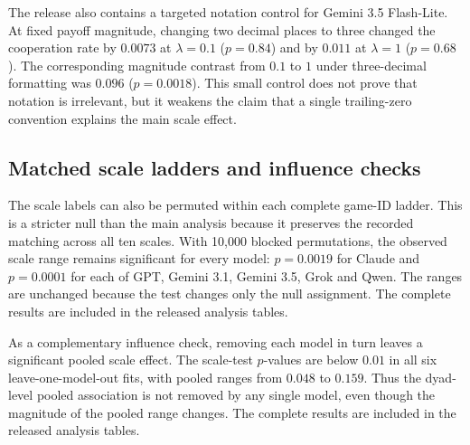 \documentclass[openacc]{rsproca_new}
\begin{document}
The release also contains a targeted notation control for Gemini 3.5 Flash-Lite.
At fixed payoff magnitude, changing two decimal places to three changed the
cooperation rate by $0.0073$ at $\lambda=0.1$ ($p=0.84$) and by $0.011$ at
$\lambda=1$ ($p=0.68$). The corresponding magnitude contrast from $0.1$ to $1$
under three-decimal formatting was $0.096$ ($p=0.0018$). This small control
does not prove that notation is irrelevant, but it weakens the claim that a
single trailing-zero convention explains the main scale effect.


\subsection{Matched scale ladders and influence checks}\label{appendix:robust_ladders}

The scale labels can also be permuted within each complete game-ID ladder. This
is a stricter null than the main analysis because it preserves the recorded
matching across all ten scales. With 10,000 blocked permutations, the observed
scale range remains significant for every model: $p=0.0019$ for Claude and
$p=0.0001$ for each of GPT, Gemini 3.1, Gemini 3.5, Grok and Qwen. The ranges
are unchanged because the test changes only the null assignment. The complete
results are included in the released analysis tables.

As a complementary influence check, removing each model in turn leaves a
significant pooled scale effect. The scale-test $p$-values are below $0.01$ in
all six leave-one-model-out fits, with pooled ranges from $0.048$ to $0.159$.
Thus the dyad-level pooled association is not removed by any single model,
even though the magnitude of the pooled range changes. The complete results are included in the
released analysis tables.
\end{document}
